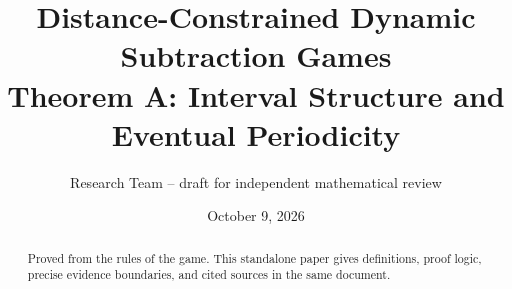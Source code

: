 \documentclass[11pt]{article}
\title{\textbf{Distance-Constrained Dynamic Subtraction Games}\\[0.4em]Theorem A: Interval Structure and Eventual Periodicity}
\author{Research Team -- draft for independent mathematical review}
\date{October 9, 2026}
\begin{document}
\maketitle
\begin{abstract}Proved from the rules of the game. This standalone paper gives definitions, proof logic, precise evidence boundaries, and cited sources in the same document.\end{abstract}
\tableofcontents


\end{document}
